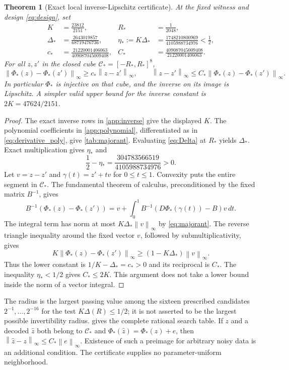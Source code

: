 \documentclass[11pt,a4paper]{article}
\numberwithin{equation}{section}
\newtheorem{theorem}{Theorem}[section]
\theoremstyle{definition}
\theoremstyle{remark}
\newcommand{\norm}[1]{\left\lVert #1\right\rVert}
\begin{document}
\begin{theorem}[Exact local inverse-Lipschitz certificate]
\label{thm:stability}
At the fixed witness and design \eqref{eq:design}, set
\begin{align}\label{eq:stabilityvalues}
 K&=\frac{23812}{2151},& R_*&=\frac1{2048},\nonumber\\
 \Delta_*&=\frac{2643019857}{68719476736},&
 \eta_*:=K\Delta_*&=\frac{1748210800969}{4105988734976}<\frac12,\nonumber\\
 c_*&=\frac{21220001406063}{409087045009408},&
 C_*&=\frac{409087045009408}{21220001406063}.
\end{align}
For all $z,z'$ in the closed cube
$\mathcal C_*=[-R_*,R_*]^8$,
\begin{equation}\label{eq:stability}
 \norm{\Phi_*(z)-\Phi_*(z')}_\infty\geq
 c_*\norm{z-z'}_\infty,
 \qquad
 \norm{z-z'}_\infty\leq C_*\norm{\Phi_*(z)-\Phi_*(z')}_\infty.
\end{equation}
In particular $\Phi_*$ is injective on that cube, and the inverse on its
image is Lipschitz. A simpler valid upper bound for the inverse constant
is $2K=47624/2151$.
\end{theorem}
\begin{proof}
The exact inverse rows in \cref{app:inverse} give the displayed $K$.
The polynomial coefficients in \cref{app:polynomial}, differentiated as
in \eqref{eq:derivative_poly}, give \cref{tab:majorant}. Evaluating
\eqref{eq:Delta} at $R_*$ yields $\Delta_*$. Exact multiplication gives
$\eta_*$ and
\[
 \frac12-\eta_*=\frac{304783566519}{4105988734976}>0.
\]
Let $v=z-z'$ and $\gamma(t)=z'+tv$ for $0\leq t\leq1$.
Convexity puts the entire segment in $\mathcal C_*$. The fundamental
theorem of calculus, preconditioned by the fixed matrix $B^{-1}$, gives
\[
 B^{-1}(\Phi_*(z)-\Phi_*(z'))
 =v+\int_0^1B^{-1}(D\Phi_*(\gamma(t))-B)v\,dt.
\]
The integral term has norm at most $K\Delta_*\norm{v}_\infty$ by
\eqref{eq:majorant}. The reverse triangle inequality around the fixed
vector $v$, followed by submultiplicativity, gives
\[
 K\norm{\Phi_*(z)-\Phi_*(z')}_\infty
 \geq(1-K\Delta_*)\norm{v}_\infty.
\]
Thus the lower constant is $1/K-\Delta_*=c_*>0$ and its reciprocal is
$C_*$. The inequality $\eta_*<1/2$ gives $C_*\leq2K$. This argument
does not take a lower bound inside the norm of a vector integral.
\end{proof}

The radius is the largest passing value among the sixteen prescribed
candidates $2^{-1},\ldots,2^{-16}$ for the test $K\Delta(R)\leq1/2$;
it is not asserted to be the largest possible invertibility radius.
 gives the complete rational search table. If $z$ and a
decoded $\widehat z$ both belong to $\mathcal C_*$ and
$\Phi_*(\widehat z)=\Phi_*(z)+e$, then
$\norm{\widehat z-z}_\infty\leq C_*\norm e_\infty$.
Existence of such a preimage for arbitrary noisy data is an additional
condition. The certificate supplies no parameter-uniform neighborhood.
\end{document}
